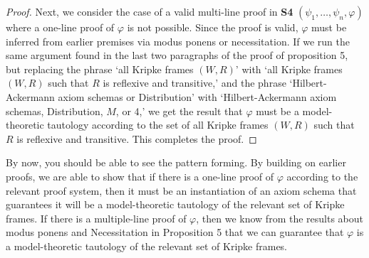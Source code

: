 \documentclass[11pt]{article}
\theoremstyle{definition}
\theoremstyle{remark}
\begin{document}
\begin{proof}
    Next, we consider the case of a valid multi-line proof in \textbf{S4} $(\psi_{1},\dots,\psi_{n},\varphi)$ where a one-line proof of $\varphi$ is not possible. Since the proof is valid, $\varphi$ must be inferred from earlier premises via modus ponens or necessitation. If we run the same argument found in the last two paragraphs of the proof of proposition 5, but replacing the phrase `all Kripke frames $(W,R)$' with `all Kripke frames $(W,R)$ such that $R$ is reflexive and transitive,' and the phrase `Hilbert-Ackermann axiom schemas or Distribution' with `Hilbert-Ackermann axiom schemas, Distribution, $M$, or 4,' we get the result that $\varphi$ must be a model-theoretic tautology according to the set of all Kripke frames $(W,R)$ such that $R$ is reflexive and transitive. This completes the proof.
\end{proof}
\noindent
By now, you should be able to see the pattern forming. By building on earlier proofs, we are able to show that if there is a one-line proof of $\varphi$ according to the relevant proof system, then it must be an instantiation of an axiom schema that guarantees it will be a model-theoretic tautology of the relevant set of Kripke frames. If there is a multiple-line proof of $\varphi$, then we know from the results about modus ponens and Necessitation in Proposition 5 that we can guarantee that $\varphi$ is a model-theoretic tautology of the relevant set of Kripke frames.\par 
\end{document}
